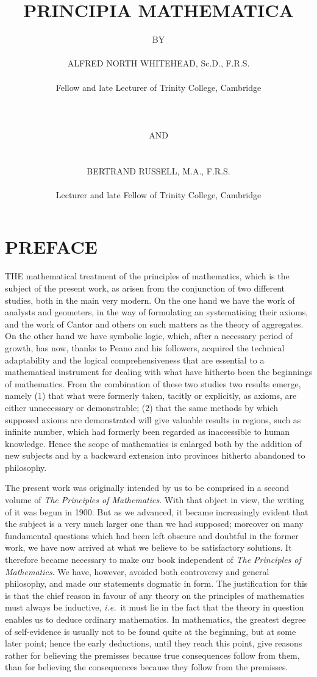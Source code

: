 \documentclass[letterpaper,12pt,openany,leqno]{book}
\title{\Huge \textbf{PRINCIPIA MATHEMATICA}}
\author{BY \\ \\ 
	ALFRED NORTH WHITEHEAD, Sc.D., F.R.S. \\ 
	\begin{small} Fellow and late Lecturer of Trinity College, Cambridge \end{small}
	\\ \\ \begin{small} AND \end{small} \\ \\
	BERTRAND RUSSELL, M.A., F.R.S. \\ 
	\begin{small} Lecturer and late Fellow of Trinity College, Cambridge \end{small}}
\date{\vspace{3cm}
	VOLUME I \\
	\vspace{3cm} 
	Critical edition by Landon D. C. Elkind \\ 
	 \begin{small} Killam Postdoctoral Fellow of University of Alberta \end{small} \\
	 \vspace{2cm}
	Version date \today}
\newcommand{\pagefirst}[1]{\marginnote[\boxed{\text{#1}}]{\boxed{\text{#1}}}}
\begin{document}
 

\maketitle

\frontmatter

\chapter*{\centering PREFACE}  \setcounter{page}{5}\pagefirst{v}

THE mathematical treatment of the principles of mathematics, which is the subject of the present work, as arisen from the conjunction of two different studies, both in the main very modern. On the one hand we have the work of analysts and geometers, in the way of formulating an systematising their axioms, and the work of Cantor and others on such matters as the theory of aggregates. On the other hand we have symbolic logic, which, after a necessary period of growth, has now, thanks to Peano and his followers, acquired the technical adaptability and the logical comprehensiveness that are essential to a mathematical instrument for dealing with what have hitherto been the beginnings of mathematics. From the combination of these two studies two results emerge, namely (1) that what were formerly taken, tacitly or explicitly, as axioms, are either unnecessary or demonstrable; (2) that the same methods by which supposed axioms are demonstrated will give valuable results in regions, such as infinite number, which had formerly been regarded as inaccessible to human knowledge. Hence the scope of mathematics is enlarged both by the addition of new subjects and by a backward extension into provinces hitherto abandoned to philosophy. 

The present work was originally intended by us to be comprised in a second volume of \textit{The Principles of Mathematics}. With that object in view, the writing of it was begun in 1900. But as we advanced, it became increasingly evident that the subject is a very much larger one than we had supposed; moreover on many fundamental questions which had been left obscure and doubtful in the former work, we have now arrived at what we believe to be satisfactory solutions. It therefore became necessary to make our book independent of \textit{The Principles of Mathematics}. We have, however, avoided both controversy and general philosophy, and made our statements dogmatic in form. The justification for this is that the chief reason in favour of any theory on the principles of mathematics must always be inductive, \textit{i.e.}\ it must lie in the fact that the theory in question enables us to deduce ordinary mathematics. In mathematics, the greatest degree of self-evidence is usually not to be found quite at the beginning, but at some later point; hence the early deductions, until they reach this point, give reasons rather \pagefirst{vi} for believing the premisses because true consequences follow from them, than for believing the consequences because they follow from the premisses.
\end{document}

